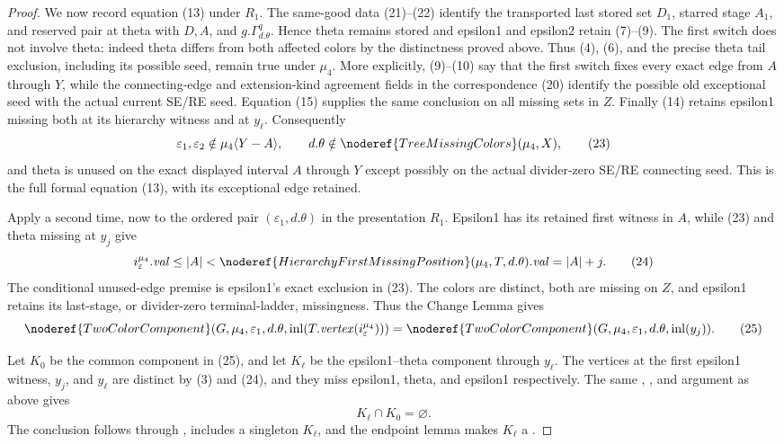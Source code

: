 \begin{proof}
We now record equation (13) under $R_1$.  The same-good data (21)--(22)
identify the transported last stored set $D_1$, starred stage $A_1$,
and reserved pair at theta with $D,A$, and
$g.\Gamma^q_{d.\theta}$.  Hence theta remains stored and epsilon1 and
epsilon2 retain (7)--(9).  The first switch does not involve theta:
indeed theta differs from both affected colors by the distinctness
proved above.  Thus (4), (6), and the precise theta tail exclusion,
including its possible seed, remain true under $\mu _4$.  More
explicitly, (9)--(10) say that the first switch fixes every exact edge
from $A$ through $Y$, while the connecting-edge and extension-kind
agreement fields in the correspondence (20) identify the possible old
exceptional seed with the actual current SE/RE seed.  Equation (15)
supplies the same conclusion on all missing sets in $Z$.  Finally (14)
retains epsilon1 missing both at its hierarchy witness and at
$y_\ell$.  Consequently
\[
 \varepsilon _1,\varepsilon _2\notin
    \mu _4\langle Y-A\rangle,
 \qquad
 d.\theta\notin\noderef{TreeMissingColors}(\mu _4,X),         \tag{23}
\]
and theta is unused on the exact displayed interval $A$ through $Y$
except possibly on the actual divider-zero SE/RE connecting seed.  This
is the full formal equation (13), with its exceptional edge retained.

Apply  a second time, now to the ordered pair
$(\varepsilon _1,d.\theta)$ in the presentation $R_1$.  Epsilon1 has
its retained first witness in $A$, while (23) and theta missing at $y_j$
give
\[
 i_\varepsilon^{\mu _4}.\mathit{val}\le |A|
   <\noderef{HierarchyFirstMissingPosition}
       (\mu _4,T,d.\theta).\mathit{val}=|A|+j.                \tag{24}
\]
The conditional unused-edge premise is epsilon1's exact exclusion in
(23).  The colors are distinct, both are missing on $Z$, and epsilon1
retains its last-stage, or divider-zero terminal-ladder, missingness.
Thus the Change Lemma gives
\[
 \noderef{TwoColorComponent}(G,\mu _4,\varepsilon _1,d.\theta,
   \operatorname{inl}(T.\mathit{vertex}(i_\varepsilon^{\mu _4})))
 =
 \noderef{TwoColorComponent}(G,\mu _4,\varepsilon _1,d.\theta,
   \operatorname{inl}(y_j)).                                  \tag{25}
\]

Let $K_0$ be the common component in (25), and let $K_\ell$ be the
epsilon1--theta component through $y_\ell$.  The vertices at the first
epsilon1 witness, $y_j$, and $y_\ell$ are distinct by (3) and (24), and
they miss epsilon1, theta, and epsilon1 respectively.  The same
,
, and
 argument as above gives
\[
                              K_\ell\cap K_0=\varnothing.      \tag{26}
\]
The conclusion follows through
, includes a singleton
$K_\ell$, and the endpoint lemma makes $K_\ell$ a
.


\end{proof}
